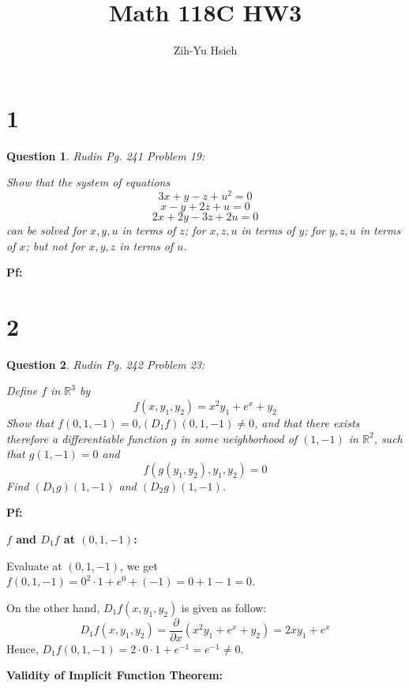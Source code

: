 \documentclass{article}
\title{Math 118C HW3}
\author{Zih-Yu Hsieh}
\newtheorem{question}{Question}
\begin{document}
\maketitle

\section*{1}
\begin{myBox}[]{}
    \begin{question}
        Rudin Pg. 241 Problem 19:

        Show that the system of equations
        $$3x+y-z+u^2=0$$
        $$x-y+2z+u=0$$
        $$2x+2y-3z+2u=0$$
        can be solved for $x,y,u$ in terms of $z$; for $x,z,u$ in terms of $y$; for $y,z,u$ in terms of $x$; but not for $x,y,z$ in terms of $u$.
    \end{question}
\end{myBox}

\textbf{Pf:}



\break

\section*{2}
\begin{myBox}[]{}
    \begin{question}
        Rudin Pg. 242 Problem 23:

        Define $f$ in $\mathbb{R}^3$ by
        $$f(x,y_1,y_2)=x^2y_1+e^x+y_2$$
        Show that $f(0,1,-1)=0$,$(D_1f)(0,1,-1)\neq 0$, and that there exists therefore a differentiable function $g$ in some neighborhood of $(1,-1)$ in $\mathbb{R}^2$,
        such that $g(1,-1)=0$ and 
        $$f(g(y_1,y_2),y_1,y_2)=0$$
        Find $(D_1g)(1,-1)$ and $(D_2g)(1,-1)$.
    \end{question}
\end{myBox}

\textbf{Pf:}

\textbf{$f$ and $D_1f$ at $(0,1,-1)$:}

Evaluate at $(0,1,-1)$, we get $f(0,1,-1) = 0^2\cdot 1 + e^0 + (-1) = 0+1-1 = 0$.

On the other hand, $D_1f(x,y_1,y_2)$ is given as follow:
$$D_1f(x,y_1,y_2) = \frac{\partial}{\partial x}(x^2y_1+e^x+y_2) = 2xy_1 + e^x$$
Hence, $D_1f(0,1,-1) = 2\cdot 0\cdot 1 + e^{-1} = e^{-1}\neq 0$.

\hfil

\textbf{Validity of Implicit Function Theorem:}
\end{document}
